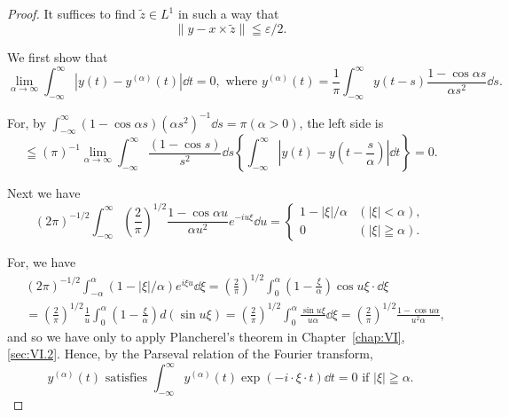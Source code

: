 \begin{proof}
 It suffices to find $\tilde{z} \in L^1$ in such a way that 
\begin{equation}\label{eq:XI.16.17}
\left\| y - x \times \tilde {z} \right\| \leqq \varepsilon / 2. \end{equation}

We first show that 
\begin{equation}\lim\limits _{\alpha \rightarrow \infty} \int_{- \infty} ^{\infty} | y (t) - y ^{(\alpha)} (t) | \dd t = 0, \text{ where } y ^{(\alpha)} (t) = \frac {1}{\pi} \int_{- \infty} ^{\infty} y (t - s) \frac {1 - \cos \alpha s}{\alpha s ^{2}} \dd s. \label{eq:XI.16.18}\end{equation}

For, by $\int_{-\infty}^{\infty}(1 - \cos \alpha s)(\alpha s^2)^{-1}\dd s = \pi (\alpha >0)$, the left side is 
\[
\leqq (\pi) ^{-1} \lim\limits _{\alpha \rightarrow \infty} \int_{- \infty} ^{\infty} \frac {(1 - \cos s)}{s ^{2}} \dd s \left\{\int_{- \infty} ^{\infty} \left| y (t) - y \left(t - \frac {s}{\alpha}\right)\right| \dd t \right\} = 0.
\]


Next we have 
\begin{equation}\label{eq:XI.16.19}
(2 \pi) ^{-1/2} \int_{- \infty} ^{\infty} \left(\frac {2}{\pi}\right) ^{1/2} \frac {1 - \cos \alpha u}{\alpha u ^{2}} e ^{- i u \xi} \dd u = \begin{cases}1 - | \xi | / \alpha & (| \xi | < \alpha), \\ 0 & (| \xi | \geqq \alpha).\end{cases}
\end{equation}

For, we have 
\[
\begin{aligned}
&(2 \pi) ^{-1/2} \int_{- \alpha} ^{\alpha} (1 - | \xi | / \alpha) e ^{i \xi u} \dd \xi  = \left(\frac {2}{\pi}\right) ^{1/2} \int_{0} ^{\alpha} \left(1 - \frac {\xi}{\alpha}\right) \cos u \xi \cdot \dd \xi \\
&= \left(\frac {2}{\pi}\right) ^{1/2} \frac {1}{u} \int_{0} ^{\alpha} \left(1 - \frac {\xi}{\alpha}\right) d (\sin u \xi) = \left(\frac {2}{\pi}\right) ^{1/2} \int_{0} ^{\alpha} \frac {\sin u \xi}{u \alpha} \dd \xi = \left(\frac {2}{\pi}\right) ^{1/2} \frac {1 - \cos u \alpha}{u ^{2} \alpha},
\end{aligned}
\]
and so we have only to apply Plancherel's theorem in Chapter~\ref{chap:VI}, \ref{sec:VI.2}. Hence, by the Parseval relation of the Fourier transform, 
\begin{equation}\label{eq:XI.16.20}
y ^{(\alpha)} (t) \text{ satisfies } \int_{- \infty} ^{\infty} y ^{(\alpha)} (t) \exp (- i \cdot \xi \cdot t) \dd t = 0 \text{ if } | \xi | \geqq \alpha .
\end{equation}


\end{proof}
